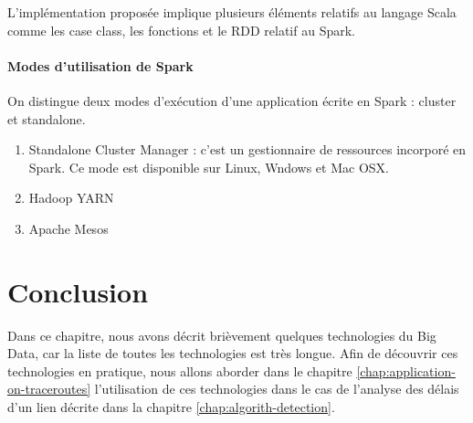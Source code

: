 L'implémentation proposée implique plusieurs éléments relatifs au langage Scala comme les case class, les fonctions et le RDD relatif au Spark. 

\paragraph{Modes d'utilisation de Spark}

On distingue deux modes d'exécution d'une application écrite en Spark : cluster et standalone. 
\begin{enumerate}
	\item Standalone Cluster Manager : c'est un gestionnaire de ressources incorporé en Spark. Ce mode est disponible sur Linux, Wndows et Mac OSX.
	\item Hadoop YARN
	\item Apache Mesos
\end{enumerate}




\section{Conclusion}

Dans ce chapitre,  nous avons décrit brièvement  quelques technologies du Big Data, car la liste de toutes les technologies est très longue. Afin de découvrir ces technologies en pratique, nous allons aborder dans le chapitre \ref{chap:application-on-traceroutes} l'utilisation de ces technologies dans le cas de l'analyse des délais d'un lien décrite dans la chapitre \ref{chap:algorith-detection}.    










